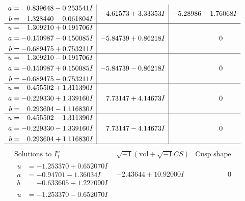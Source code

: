 \documentclass[1p]{elsarticle_modified}
\theoremstyle{definition}
\newcommand{\I}{\sqrt{-1}}
\begin{document}
$$\begin{array}{c|c|c}
\begin{aligned}
a &= \phantom{-}0.839648 - 0.253541 I \\
b &= \phantom{-}1.328440 - 0.061804 I\end{aligned}
 & -4.61573 + 3.33353 I & -5.28986 - 1.76068 I \\ \hline\begin{aligned}
u &= \phantom{-}1.309210 + 0.191706 I \\
a &= -0.150987 - 0.150085 I \\
b &= -0.689475 + 0.753211 I\end{aligned}
 & -5.84739 + 0.86218 I & \phantom{-0.000000 } 0 \\ \hline\begin{aligned}
u &= \phantom{-}1.309210 - 0.191706 I \\
a &= -0.150987 + 0.150085 I \\
b &= -0.689475 - 0.753211 I\end{aligned}
 & -5.84739 - 0.86218 I & \phantom{-0.000000 } 0 \\ \hline\begin{aligned}
u &= \phantom{-}0.455502 + 1.311390 I \\
a &= -0.229330 + 1.339160 I \\
b &= \phantom{-}0.293604 - 1.116830 I\end{aligned}
 & \phantom{-}7.73147 + 4.14673 I & \phantom{-0.000000 } 0 \\ \hline\begin{aligned}
u &= \phantom{-}0.455502 - 1.311390 I \\
a &= -0.229330 - 1.339160 I \\
b &= \phantom{-}0.293604 + 1.116830 I\end{aligned}
 & \phantom{-}7.73147 - 4.14673 I & \phantom{-0.000000 } 0\\
 \hline 
 \end{array}$$\newpage$$\begin{array}{c|c|c}  
\text{Solutions to }I^u_{1}& \I (\text{vol} + \sqrt{-1}CS) & \text{Cusp shape}\\
 \hline 
\begin{aligned}
u &= -1.253370 + 0.652070 I \\
a &= -0.94701 - 1.36034 I \\
b &= -0.633605 + 1.227090 I\end{aligned}
 & -2.43644 + 10.92000 I & \phantom{-0.000000 } 0 \\ \hline\begin{aligned}
u &= -1.253370 - 0.652070 I \\

\end{aligned}
\end{array}$$
\end{document}
